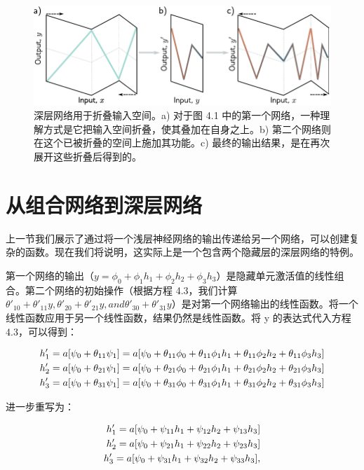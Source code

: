 \documentclass[lang=cn,newtx,10pt,scheme=chinese]{elegantbook}
\begin{document}
\begin{figure}[ht!]
	\centering
	\includegraphics[width=0.7\linewidth]{PDFFigures/UDLChap4PDF/DeepFold.pdf}
	\caption{深层网络用于折叠输入空间。a) 对于图 4.1 中的第一个网络，一种理解方式是它把输入空间折叠，使其叠加在自身之上。b) 第二个网络则在这个已被折叠的空间上施加其功能。c) 最终的输出结果，是在再次展开这些折叠后得到的。}
\end{figure}

\section{从组合网络到深层网络}
上一节我们展示了通过将一个浅层神经网络的输出传递给另一个网络，可以创建复杂的函数。现在我们将说明，这实际上是一个包含两个隐藏层的深层网络的特例。

第一个网络的输出（\(y = \phi_0 + \phi_1h_1 + \phi_2h_2 + \phi_3h_3\)）是隐藏单元激活值的线性组合。第二个网络的初始操作（根据方程 4.3，我们计算 \(\theta'_{10}+\theta'_{11}y, \theta'_{20}+\theta'_{21}y, and \theta'_{30}+\theta'_{31}y\)）是对第一个网络输出的线性函数。将一个线性函数应用于另一个线性函数，结果仍然是线性函数。将 y 的表达式代入方程 4.3，可以得到：


\begin{align}
	h'_1 = a[\psi_0 + \theta_{11} \psi_1] = a[\psi_0 + \theta_{11} \phi_0 + \theta_{11} \phi_1 h_1 + \theta_{11} \phi_2 h_2 + \theta_{11} \phi_3 h_3] \notag \\
	h'_2 = a[\psi_0 + \theta_{21} \psi_1] = a[\psi_0 + \theta_{21} \phi_0 + \theta_{21} \phi_1 h_1 + \theta_{21} \phi_2 h_2 + \theta_{21} \phi_3 h_3] \notag \\
	h'_3 = a[\psi_0 + \theta_{31} \psi_1] = a[\psi_0 + \theta_{31} \phi_0 + \theta_{31} \phi_1 h_1 + \theta_{31} \phi_2 h_2 + \theta_{31} \phi_3 h_3] 
\end{align} 


进一步重写为：


\begin{align}
	h'_1 = a[\psi_0 + \psi_{11} h_1 + \psi_{12} h_2 + \psi_{13} h_3] \notag \\
	h'_2 = a[\psi_0 + \psi_{21} h_1 + \psi_{22} h_2 + \psi_{23} h_3] \notag \\
	h'_3 = a[\psi_0 + \psi_{31} h_1 + \psi_{32} h_2 + \psi_{33} h_3], 
\end{align} 
\end{document}
